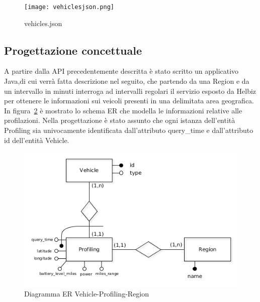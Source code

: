 \begin{figure}[H]
\centering
\texttt{[image: vehiclesjson.png]}
\caption{vehicles.json}
\label{fig:vehiclesjson}
\end{figure}

\subsection{Progettazione concettuale}

A partire dalla API precedentemente descritta è stato scritto un applicativo Java,di cui
verrà fatta descrizione nel seguito, che partendo da una Region e da un intervallo in
minuti interroga ad intervalli regolari il servizio esposto da Helbiz per ottenere le
informazioni sui veicoli presenti in una delimitata area geografica.
In figura~\ref{fig:vehicle_profiling_er} è mostrato lo schema ER che modella le informazioni
relative alle profilazioni. Nella progettazione è stato assunto che ogni istanza
dell'entità Profiling sia univocamente identificata dall'attributo query\_time e
dall'attributo id dell'entità Vehicle.

\begin{figure}[H]                                                                                                                                                            
\centering                                                                                                                                                                   
\includegraphics[width=\textwidth]{diagrams/vehicle_profiling_er}                                                                                                                                   
\caption{Diagramma ER Vehicle-Profiling-Region}                                                                                                                                            
\label{fig:vehicle_profiling_er}                                                                                                                                                           
\end{figure}

